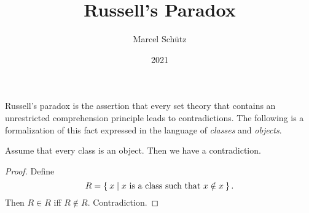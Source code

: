 \documentclass{article}
\title{Russell's Paradox}
\author{Marcel Schütz}
\date{2021}
\begin{document}

  \maketitle

  Russell's paradox is the assertion that every set theory that contains an
  unrestricted comprehension principle leads to contradictions.
  The following is a formalization of this fact expressed in the language of
  \textit{classes} and \textit{objects}.

  \begin{forthel}
    \begin{theorem}[Russell]
      Assume that every class is an object.
      Then we have a contradiction.
    \end{theorem}
    \begin{proof}
      Define \[ R = \Set{x | \text{$x$ is a class such that $x \notin x$}}. \]
      Then $R \in R$ iff $R \notin R$.
      Contradiction.
    \end{proof}
  \end{forthel}
\end{document}
